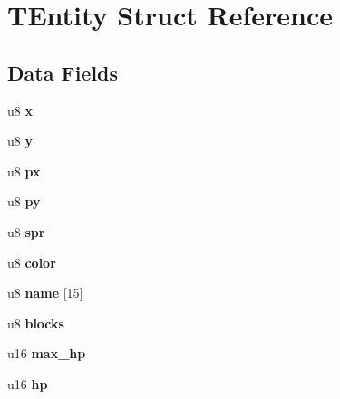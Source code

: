 \hypertarget{structTEntity}{}\section{T\+Entity Struct Reference}
\label{structTEntity}
\subsection*{Data Fields}
\begin{DoxyCompactItemize}
\item 
\mbox{\label{structTEntity_aa9654f5fea77b3a1d597c426083dfa4f}} 
u8 {\bfseries x}
\item 
\mbox{\label{structTEntity_a992cabf44fdd38691c86fc2800186883}} 
u8 {\bfseries y}
\item 
\mbox{\label{structTEntity_a5317c885222b1ae10ac0c18d5c5e6f4a}} 
u8 {\bfseries px}
\item 
\mbox{\label{structTEntity_a1b3f7bed4154c0c97af933097bb3824b}} 
u8 {\bfseries py}
\item 
\mbox{\label{structTEntity_a3eefb2e935358c20d7f4c3e0f01ea24b}} 
u8 {\bfseries spr}
\item 
\mbox{\label{structTEntity_a98f63d089a0aa9346f8c720c11228c90}} 
u8 {\bfseries color}
\item 
\mbox{\label{structTEntity_ad708fe1bf8843ba2a637b12cd412411b}} 
u8 {\bfseries name} \mbox{[}15\mbox{]}
\item 
\mbox{\label{structTEntity_aa9e108d2c0e05e6224c2a6146b4bc3c3}} 
u8 {\bfseries blocks}
\item 
\mbox{\label{structTEntity_ae429359d305baeb0740a36045e4c75ef}} 
u16 {\bfseries max\+\_\+hp}
\item 
\mbox{\label{structTEntity_abf31a7e02e8385630372b229838e2a0f}} 
u16 {\bfseries hp}
\item 
\mbox{\label{structTEntity_aa0313474d60671422028956f7c7b9853}} 

\end{DoxyCompactItemize}
